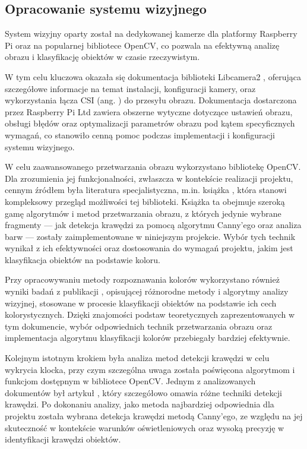 \subsection{Opracowanie systemu wizyjnego}

System wizyjny oparty został na dedykowanej kamerze dla platformy Raspberry Pi oraz na popularnej bibliotece OpenCV, co pozwala na efektywną analizę obrazu i klasyfikację obiektów w czasie rzeczywistym. 

W tym celu kluczowa okazała się dokumentacja biblioteki Libcamera2 \cite{bib:manualLibcamera2}, oferująca szczegółowe informacje na temat instalacji, konfiguracji kamery, oraz wykorzystania łącza CSI (ang. ) do przesyłu obrazu. Dokumentacja dostarczona przez Raspberry Pi Ltd zawiera obszerne wytyczne dotyczące ustawień obrazu, obsługi błędów oraz optymalizacji parametrów obrazu pod kątem specyficznych wymagań, co stanowiło cenną pomoc podczas implementacji i konfiguracji systemu wizyjnego.

W celu zaawansowanego przetwarzania obrazu wykorzystano bibliotekę OpenCV. Dla zrozumienia jej funkcjonalności, zwłaszcza w kontekście realizacji projektu, cennym źródłem była literatura specjalistyczna, m.in. książka \cite{bib:ksiazka}, która stanowi kompleksowy przegląd możliwości tej biblioteki. Książka ta obejmuje szeroką gamę algorytmów i metod przetwarzania obrazu, z których jedynie wybrane fragmenty — jak detekcja krawędzi za pomocą algorytmu Canny’ego oraz analiza barw — zostały zaimplementowane w niniejszym projekcie. Wybór tych technik wynikał z ich efektywności oraz dostosowania do wymagań projektu, jakim jest klasyfikacja obiektów na podstawie koloru.

Przy opracowywaniu metody rozpoznawania kolorów wykorzystano również wyniki badań z publikacji \cite{bib:artykul2}, opisującej różnorodne metody i algorytmy analizy wizyjnej, stosowane w procesie klasyfikacji obiektów na podstawie ich cech kolorystycznych. Dzięki znajomości podstaw teoretycznych zaprezentowanych w tym dokumencie, wybór odpowiednich technik przetwarzania obrazu oraz implementacja algorytmu klasyfikacji kolorów przebiegały bardziej efektywnie.

Kolejnym istotnym krokiem była analiza metod detekcji krawędzi w celu wykrycia klocka, przy czym szczególna uwaga została poświęcona algorytmom i funkcjom dostępnym w bibliotece OpenCV. Jednym z analizowanych dokumentów był artykuł \cite{bib:artykul}, który szczegółowo omawia różne techniki detekcji krawędzi. Po dokonaniu analizy, jako metoda najbardziej odpowiednia dla projektu została wybrana detekcja krawędzi metodą Canny’ego, ze względu na jej skuteczność w kontekście warunków oświetleniowych oraz wysoką precyzję w identyfikacji krawędzi obiektów.


